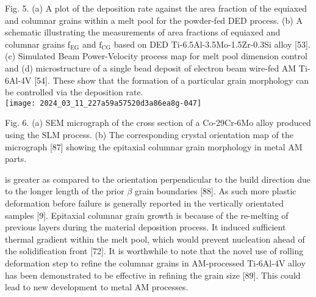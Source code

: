 \documentclass[10pt]{article}
\begin{document}
Fig. 5. (a) A plot of the deposition rate against the area fraction of the equiaxed and columnar grains within a melt pool for the powder-fed DED process. (b) A schematic illustrating the measurements of area fractions of equiaxed and columnar grains $\mathrm{f}_{\mathrm{EG}}$ and $\mathrm{f}_{\mathrm{CG}}$ based on DED Ti-6.5Al-3.5Mo-1.5Zr-0.3Si alloy [53]. (c) Simulated Beam Power-Velocity process map for melt pool dimension control and (d) microstructure of a single bead deposit of electron beam wire-fed AM Ti-6Al-4V [54]. These show that the formation of a particular grain morphology can be controlled via the deposition rate.\\
\texttt{[image: 2024\_03\_11\_227a59a57520d3a86ea8g-047]}

Fig. 6. (a) SEM micrograph of the cross section of a Co-29Cr-6Mo alloy produced using the SLM process. (b) The corresponding crystal orientation map of the micrograph [87] showing the epitaxial columnar grain morphology in metal AM parts.

is greater as compared to the orientation perpendicular to the build direction due to the longer length of the prior $\beta$ grain boundaries [88]. As such more plastic deformation before failure is generally reported in the vertically orientated samples [9]. Epitaxial columnar grain growth is because of the re-melting of previous layers during the material deposition process. It induced sufficient thermal gradient within the melt pool, which would prevent nucleation ahead of the solidification front [72]. It is worthwhile to note that the novel use of rolling deformation step to refine the columnar grains in AM-processed Ti-6Al-4V alloy has been demonstrated to be effective in refining the grain size [89]. This could lead to new development to metal AM processes.
\end{document}
